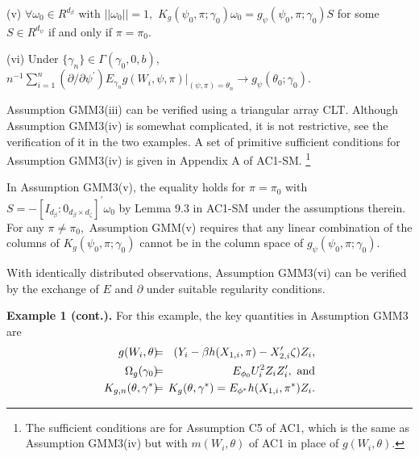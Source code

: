 \documentclass[12pt,titlepage,final,oneside,letterpaper]{article}
\begin{document}
\noindent (v) $\forall \omega _{0}\in R^{d_{\beta }}$ with $||\omega
_{0}||=1,$ $K_{g}(\psi _{0},\pi ;\gamma _{0})\omega _{0}=g_{\psi }(\psi
_{0},\pi ;\gamma _{0})S$ for some $S\in R^{d_{\psi }}$ if and only if $\pi
=\pi _{0}.$

\noindent (vi) Under $\{\gamma _{n}\}\in \Gamma (\gamma _{0},0,b),$ $%
n^{-1}\sum_{i=1}^{n}(\partial /\partial \psi ^{\prime })E_{\gamma
_{n}}g(W_{i},\psi ,\pi )|_{(\psi ,\pi )=\theta _{n}}\rightarrow g_{\psi
}(\theta _{0};\gamma _{0}).$\medskip

Assumption GMM3(iii) can be verified using a triangular array CLT. Although
Assumption GMM3(iv) is somewhat complicated, it is not restrictive, see the
verification of it in the two examples. A set of primitive sufficient
conditions for Assumption GMM3(iv) is given in Appendix A of AC1-SM.%
\footnote{%
The sufficient conditions are for Assumption C5 of AC1, which is the same as
Assumption GMM3(iv) but with $m(W_{i},\theta )$ of AC1 in place of $%
g(W_{i},\theta ).$}

In Assumption GMM3(v), the equality holds for $\pi =\pi _{0}$ with $%
S=-[I_{d_{\beta }}:0_{d_{\beta }\times d_{\zeta }}]^{\prime }\omega _{0}$ by
Lemma 9.3 in AC1-SM under the assumptions therein. For any $\pi \neq \pi
_{0},$ Assumption GMM(v) requires that any linear combination of the columns
of $K_{g}(\psi _{0},\pi ;\gamma _{0})$ cannot be in the column space of $%
g_{\psi }(\psi _{0},\pi ;\gamma _{0}).$

With identically distributed observations, Assumption GMM3(vi) can be
verified by the exchange of $E$ and $\partial $ under suitable regularity
conditions.\medskip

\noindent \textbf{Example 1 (cont.). }For this example, the key quantities
in Assumption GMM3 are%
\begin{eqnarray}
g(W_{i},\theta )\hspace{-0.08in} &=&\hspace{-0.08in}(Y_{i}-\beta
h(X_{1,i},\pi )-X_{2,i}^{\prime }\zeta )Z_{i},  \notag \\
\Omega _{g}(\gamma _{0})\hspace{-0.08in} &=&\hspace{-0.08in}E_{\phi
_{0}}U_{i}^{2}Z_{i}Z_{i}^{\prime },\text{ and}  \notag \\
K_{g,n}(\theta ,\gamma ^{\ast })\hspace{-0.08in} &=&\hspace{-0.08in}%
K_{g}(\theta ,\gamma ^{\ast })=E_{\phi ^{\ast }}h(X_{1,i},\pi ^{\ast })Z_{i}.
\label{GMM3_key quant}
\end{eqnarray}
\end{document}
